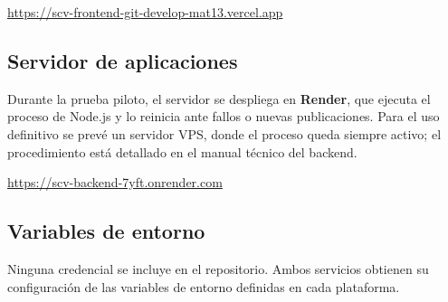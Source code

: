 \documentclass[11pt,letterpaper]{article}
\begin{document}
\begin{center}
\url{https://scv-frontend-git-develop-mat13.vercel.app}
\end{center}

\subsection{Servidor de aplicaciones}
Durante la prueba piloto, el servidor se despliega en \textbf{Render}, que ejecuta el proceso de Node.js y lo reinicia ante fallos o nuevas publicaciones. Para el uso definitivo se prevé un servidor VPS, donde el proceso queda siempre activo; el procedimiento está detallado en el manual técnico del backend.

\begin{center}
\url{https://scv-backend-7yft.onrender.com}
\end{center}

\subsection{Variables de entorno}
Ninguna credencial se incluye en el repositorio. Ambos servicios obtienen su configuración de las variables de entorno definidas en cada plataforma.
\end{document}
